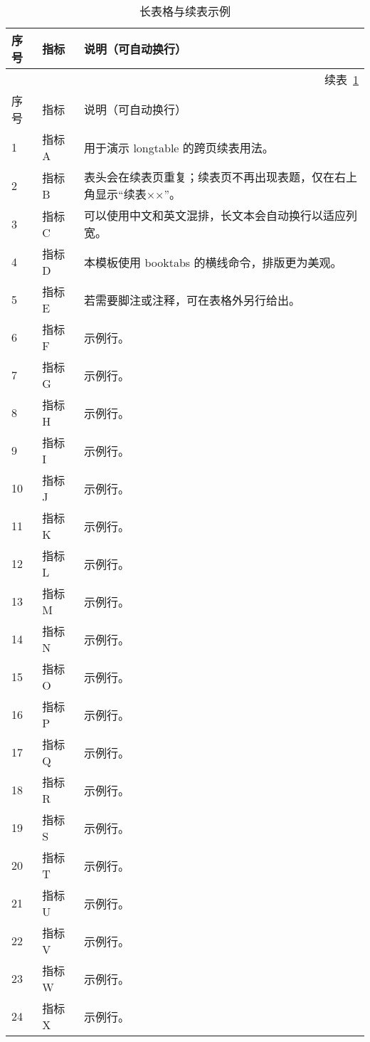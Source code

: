 \begin{longtable}{p{2.2cm} p{3.2cm} p{6.5cm}}
  \caption{长表格与续表示例}\label{tab:lt}\\
  \toprule
  序号 & 指标 & 说明（可自动换行） \\
  \midrule
  \endfirsthead
  \multicolumn{3}{r}{续表~\ref{tab:lt}}\\
  \toprule
  序号 & 指标 & 说明（可自动换行） \\
  \midrule
  \endhead
  \bottomrule
  \endfoot
  \bottomrule
  \endlastfoot
  1  & 指标 A & 用于演示 longtable 的跨页续表用法。 \\
  2  & 指标 B & 表头会在续表页重复；续表页不再出现表题，仅在右上角显示“续表××”。 \\
  3  & 指标 C & 可以使用中文和英文混排，长文本会自动换行以适应列宽。 \\
  4  & 指标 D & 本模板使用 booktabs 的横线命令，排版更为美观。 \\
  5  & 指标 E & 若需要脚注或注释，可在表格外另行给出。 \\
  6  & 指标 F & 示例行。 \\
  7  & 指标 G & 示例行。 \\
  8  & 指标 H & 示例行。 \\
  9  & 指标 I & 示例行。 \\
  10 & 指标 J & 示例行。 \\
  11 & 指标 K & 示例行。 \\
  12 & 指标 L & 示例行。 \\
  13 & 指标 M & 示例行。 \\
  14 & 指标 N & 示例行。 \\
  15 & 指标 O & 示例行。 \\
  16 & 指标 P & 示例行。 \\
  17 & 指标 Q & 示例行。 \\
  18 & 指标 R & 示例行。 \\
  19 & 指标 S & 示例行。 \\
  20 & 指标 T & 示例行。 \\
  21 & 指标 U & 示例行。 \\
  22 & 指标 V & 示例行。 \\
  23 & 指标 W & 示例行。 \\
  24 & 指标 X & 示例行。 \\

\end{longtable}
